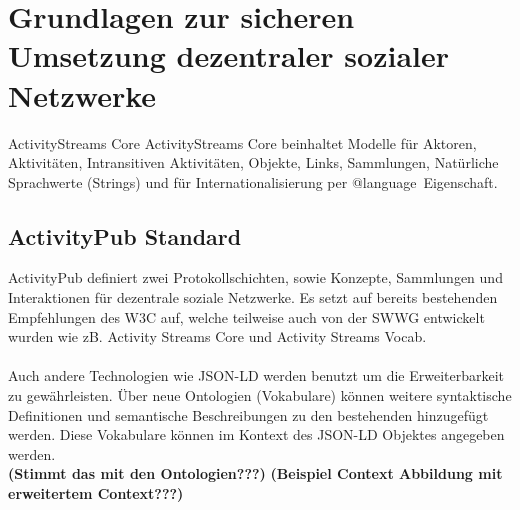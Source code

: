 
\chapter{Grundlagen zur sicheren Umsetzung dezentraler sozialer Netzwerke}
\label{ch:fundamentals}
\glqq ActivityStreams Core\grqq
ActivityStreams Core beinhaltet Modelle für Aktoren, Aktivitäten, Intransitiven Aktivitäten, Objekte, Links, Sammlungen, Natürliche Sprachwerte (Strings) und für Internationalisierung per \glqq @language\grqq~Eigenschaft.
\section{ActivityPub Standard}
	ActivityPub definiert zwei Protokollschichten, sowie Konzepte, Sammlungen und Interaktionen für dezentrale soziale Netzwerke. Es setzt auf bereits bestehenden Empfehlungen des W3C auf, welche teilweise auch von der SWWG entwickelt wurden wie zB. Activity Streams Core und Activity Streams Vocab.
	\\\\Auch andere Technologien wie JSON-LD\cite{jsonLd} werden benutzt um die Erweiterbarkeit zu gewährleisten. Über neue Ontologien (Vokabulare) können weitere syntaktische Definitionen und semantische Beschreibungen zu den bestehenden hinzugefügt werden. Diese Vokabulare können im Kontext des JSON-LD Objektes angegeben werden.\\
	\textbf{(Stimmt das mit den Ontologien???)}
		\textbf{(Beispiel Context Abbildung mit erweitertem Context???)}

